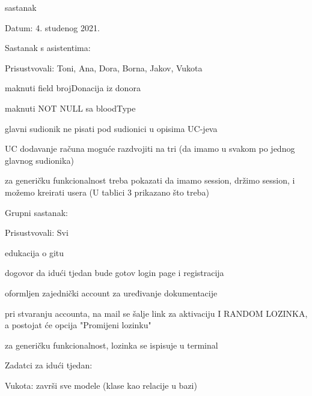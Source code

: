 \begin{packed_enum}
            \bigskip
            \item sastanak
            \item[] \begin{packed_item}
                \item Datum: 4. studenog 2021.
                \item Sastanak s asistentima:
                \item[] \begin{packed_item}
                    \item Prisustvovali: Toni, Ana, Dora, Borna, Jakov, Vukota
                    \item maknuti field brojDonacija iz donora
                    \item maknuti NOT NULL sa bloodType
                    \item glavni sudionik ne pisati pod sudionici u opisima UC-jeva
                    \item UC dodavanje računa moguće razdvojiti na tri (da imamo u svakom po jednog glavnog sudionika)
                    \item za generičku funkcionalnost treba pokazati da imamo session, držimo session, i možemo kreirati usera (U tablici 3 prikazano što treba)
                \end{packed_item}
                \item Grupni sastanak:
                \item[] \begin{packed_item}
                    \item Prisustvovali: Svi
                    \item edukacija o gitu
                    \item dogovor da idući tjedan bude gotov login page i registracija
                    \item oformljen zajednički account za uređivanje dokumentacije
                    \item pri stvaranju accounta, na mail se šalje link za aktivaciju I RANDOM LOZINKA, a postojat će opcija "Promijeni lozinku"
                    \item za generičku funkcionalnost, lozinka se ispisuje u terminal
                \end{packed_item}
                \item Zadatci za idući tjedan:
                \item[] \begin{packed_item}
                    \item Vukota: završi sve modele (klase kao relacije u bazi)

\end{packed_item}
\end{packed_item}
\end{packed_enum}
